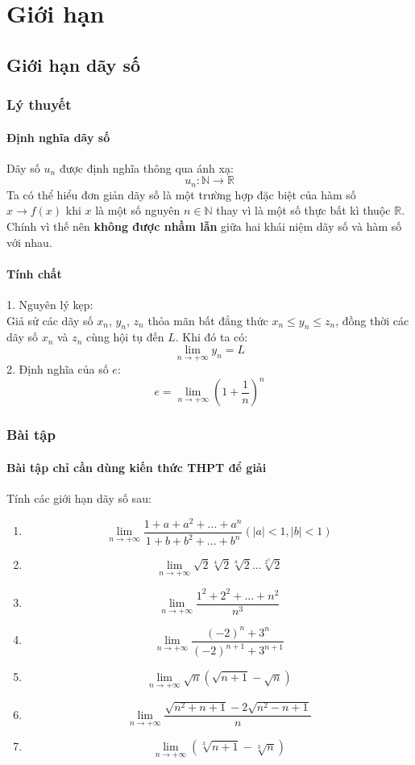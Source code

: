 \chapter{Giới hạn}
\section{Giới hạn dãy số}
\subsection{Lý thuyết}
\subsubsection{Định nghĩa dãy số}
Dãy số $u_{n}$ được định nghĩa thông qua ánh xạ:
$$u_{n}:\mathbb{N}\rightarrow\mathbb{R}$$
Ta có thể hiểu đơn giản dãy số là một trường hợp đặc biệt của hàm số $x\rightarrow f(x)$ khi $x$ là một số nguyên $n\in\mathbb{N}$ thay vì là một số thực bất kì thuộc $\mathbb{R}$. Chính vì thế nên \textbf{không được nhầm
lẫn} giữa hai khái niệm dãy số và hàm số với nhau. 
\subsubsection{Tính chất}
1. Nguyên lý kẹp:
\\ Giả sử các dãy số $x_{n}$, $y_{n}$, $z_{n}$ thỏa mãn bất đẳng thức $x_{n}\leq y_{n}\leq z_{n}$, đồng thời các dãy số $x_{n}$ và $z_{n}$ cùng hội tụ đến $L$. Khi đó ta có:
\begin{equation} \label{eq:first}
    \lim_{n\to+\infty}y_{n}=L
\end{equation}
2. Định nghĩa của số $e$:
\begin{equation} \label{eq:second}
    e=\lim_{n\to+\infty}\left(1+\frac{1}{n}\right)^n
\end{equation}
\subsection{Bài tập}
\subsubsection{Bài tập chỉ cần dùng kiến thức THPT để giải}
Tính các giới hạn dãy số sau:
\begin{enumerate}
    \item $$\lim_{n\to+\infty}\frac{1+a+a^2+...+a^n}{1+b+b^2+...+b^n} (|a|<1, |b|<1)$$
    \item $$\lim_{n\to+\infty}\sqrt{2}\sqrt[4]{2}\sqrt[8]{2}...\sqrt[2^n]{2}$$
    \item $$\lim_{n\to+\infty}\frac{1^2+2^2+...+n^2}{n^3}$$
    \item $$\lim_{n\to+\infty}\frac{(-2)^n+3^n}{(-2)^{n+1}+3^{n+1}}$$
    \item $$\lim_{n\to+\infty}\sqrt{n}(\sqrt{n+1}-\sqrt{n})$$
    \item $$\lim_{n\to+\infty}\frac{\sqrt{n^2+n+1}-2\sqrt{n^2-n+1}}{n}$$
    \item $$\lim_{n\to+\infty}(\sqrt[3]{n+1}-\sqrt[3]{n})$$
\end{enumerate}
